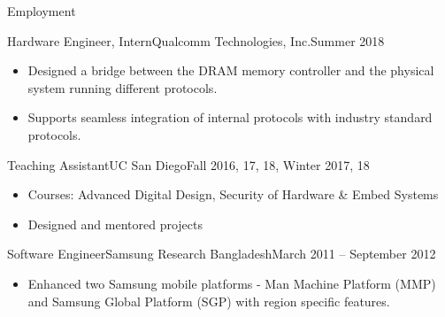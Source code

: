 \documentclass[]{mcdowellcv}
\begin{document}
	\makeheader
	
	\begin{cvsection}{Employment}
		\begin{cvsubsection}{Hardware Engineer, Intern}{Qualcomm Technologies, Inc.}{Summer 2018}			
			\begin{itemize}
				\item Designed a bridge between the DRAM memory controller and the physical system running different protocols.
				\item Supports seamless integration of internal protocols with industry standard protocols.
			\end{itemize}
		\end{cvsubsection}
		
		\begin{cvsubsection}{Teaching Assistant}{UC San Diego}{Fall 2016, 17, 18, Winter 2017, 18}	
			\begin{itemize}
				\item Courses: Advanced Digital Design, Security of Hardware \& Embed Systems
				\item Designed and mentored projects
			\end{itemize}
		\end{cvsubsection}
		
		\begin{cvsubsection}{Software Engineer}{Samsung Research Bangladesh}{March 2011 -- September 2012}		
			\begin{itemize}
				\item Enhanced two Samsung mobile platforms - Man Machine Platform (MMP) and Samsung Global Platform (SGP) with region specific features.
			\end{itemize}
		\end{cvsubsection}
	\end{cvsection}
	
\end{document}

